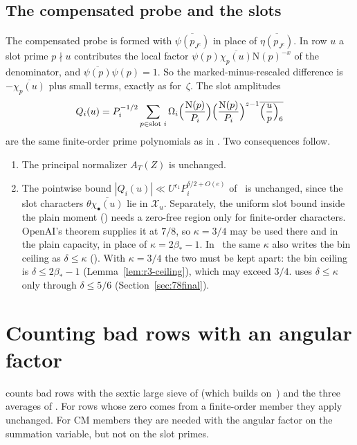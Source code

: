 \documentclass[11pt]{article}
\numberwithin{equation}{section}
\newcommand{\N}{\mathrm N}
\begin{document}
\subsection{The compensated probe and the slots}
The compensated probe \cite[\S4.2]{G78} is formed with $\overline{\psi(p_{J^c})}$ in place of
$\overline{\eta(p_{J^c})}$. In row $u$ a slot prime $p\nmid u$ contributes the local factor
$\psi(p)\overline{\chi_p(u)}\N(p)^{-x}$ of the denominator, and $\overline{\psi(p)}\psi(p)=1$. So the
marked-minus-rescaled difference is $-\overline{\chi_p(u)}$ plus small terms, exactly as
for~$\zeta$. The slot amplitudes
\begin{equation}\label{eq:d081}
 Q_i(u)=P_i^{-1/2}\sum_{p\in\text{slot }i}\Omega_i\Bigl(\frac{\N(p)}{P_i}\Bigr)
 \Bigl(\frac{\N(p)}{P_i}\Bigr)^{z-1}\overline{\Bigl(\frac up\Bigr)_6}
\end{equation}
are the same finite-order prime polynomials as in \cite[\S4.4]{G78}. Two consequences
follow.
\begin{enumerate}
\item The principal normalizer $A_T(Z)$ is unchanged.
\item The pointwise bound $|Q_i(u)|\ll U^{\epsilon_1}P_i^{\delta/2+O(e)}$ of~\cite[Lemma~19.1]{OAI78}
 is unchanged, since the slot characters $\theta\overline{\chi_\bullet(u)}$ lie in $\mathcal X_u$.
 Separately, the uniform slot bound inside the plain moment (\cite[eq.~(18.12)]{OAI78}) needs a
 zero-free region only for finite-order characters. OpenAI's theorem supplies it at $7/8$, so
 $\kappa=3/4$ may be used there and in the plain capacity, in place of $\kappa=2\beta_*-1$.
 In~\cite{OAI78} the same $\kappa$ also writes the bin ceiling as $\delta\le\kappa$
 (\cite[eq.~(12.2)]{OAI78}). With $\kappa=3/4$ the two must be kept apart: the bin ceiling is
 $\delta\le2\beta_*-1$ (Lemma~\ref{lem:r3-ceiling}), which may exceed $3/4$. \cite{OAI78} uses $\delta\le\kappa$ only
 through $\delta\le5/6$ (Section~\ref{sec:78final}).
\end{enumerate}

\section{Counting bad rows with an angular factor}\label{sec:78moments}
\cite{OAI78} counts bad rows with the sextic large sieve of \cite[\S3.3]{G78} (which builds on~\cite{GL,BGL,HB00}) and the three averages of \cite[\S5.1]{G78}. For rows whose zero comes from a
finite-order member they apply unchanged. For CM members they are needed with the angular
factor on the summation variable, but not on the slot primes.
\end{document}
